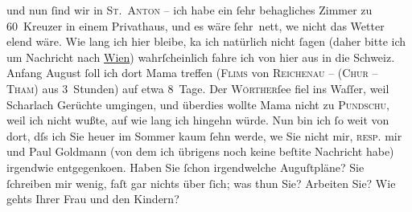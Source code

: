 \begin{ledgroupsized}[t]{13cm}
               und nun ſind wir in \textsc{St. Anton} – ich habe ein \introOben{}ſehr behagliches\introOben{} Zimmer zu 60 Kreuzer
               in einem Privat{\pb}haus, und es wäre ſehr nett, we{\geminationn} nicht das Wetter elend wäre. Wie lang ich hier bleibe,
                  ka{\geminationn} ich natürlich \introOben{}nicht\introOben{}
               ſagen (daher bitte ich um Nachricht nach \uline{Wien}) wahrſcheinlich fahre ich von hier aus in die Schweiz. Anfang August ſoll ich dort Mama treffen (\textsc{Flims} von \textsc{Reichenau} – (\textsc{Chur} – \textsc{Tham}) aus 3 Stunden) auf etwa {\pb}8 Tage. Der \textsc{Wörther}ſee fiel ins Waſſer, weil Scharlach Gerüchte
               umgingen, und überdies wollte Mama nicht zu \textsc{Pundschu}, weil ich nicht wußte, auf wie lang ich hingehn würde. Nun bin ich ſo weit von
               dort, dſs ich Sie heuer im Sommer kaum ſehn werde, we{\geminationn}
               Sie nicht mir, \textsc{resp}. mir und {\pb}Paul Goldmann (von dem ich übrigens noch keine
                  beſti{\geminationm}te Nachricht habe) irgendwie entgegenko{\geminationm}en.\pend
           \pstart
           Haben Sie ſchon irgendwelche Auguſtpläne? Sie ſchreiben mir wenig, faſt gar nichts
               über ſich; was thun Sie? Arbeiten Sie? Wie gehts Ihrer Frau und den Kindern?\pend
           \pstart

\end{ledgroupsized}
